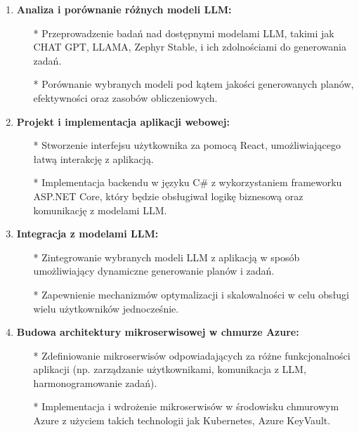 \begin{enumerate}
    \item {\bf Analiza i porównanie różnych modeli LLM:}
        \begin{itemize}
            \item[*] Przeprowadzenie badań nad dostępnymi modelami LLM, takimi jak CHAT GPT, LLAMA, Zephyr Stable, i ich zdolnościami do generowania zadań.
            \item[*] Porównanie wybranych modeli pod kątem jakości generowanych planów, efektywności oraz zasobów obliczeniowych.
       \end{itemize}
    
    \item {\bf Projekt i implementacja aplikacji webowej:}
        \begin{itemize}
            \item[*] Stworzenie interfejsu użytkownika za pomocą React, umożliwiającego łatwą interakcję z aplikacją.
            \item[*] Implementacja backendu w języku C\# z wykorzystaniem frameworku ASP.NET Core, który będzie obsługiwał logikę biznesową oraz komunikację z modelami LLM.
       \end{itemize}
    
    \item {\bf Integracja z modelami LLM:}
        \begin{itemize}
            \item[*] Zintegrowanie wybranych modeli LLM z aplikacją w sposób umożliwiający dynamiczne generowanie planów i zadań.
            \item[*] Zapewnienie mechanizmów optymalizacji i skalowalności w celu obsługi wielu użytkowników jednocześnie.
       \end{itemize}
    
    \item {\bf Budowa architektury mikroserwisowej w chmurze Azure:}
        \begin{itemize}
            \item[*] Zdefiniowanie mikroserwisów odpowiadających za różne funkcjonalności aplikacji (np. zarządzanie użytkownikami, komunikacja z LLM, harmonogramowanie zadań).
            \item[*] Implementacja i wdrożenie mikroserwisów w środowisku chmurowym Azure z użyciem takich technologii jak Kubernetes, Azure KeyVault.
       \end{itemize}
    

\end{enumerate}
